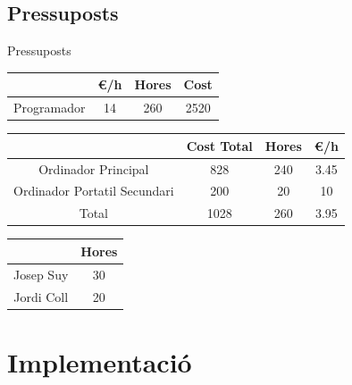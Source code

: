 \documentclass[11pt]{beamer}
\begin{document}
  \subsection{Pressuposts}
  \begin{frame}{Pressuposts}
    \begin{center}
      \begin{tabular}{|| c | c | c | c||} 
      \hline
       & \euro/h & Hores & Cost \\ [0.5ex] 
      \hline\hline
      Programador & 14 & 260 & 2520 \\ [1ex] 
      \hline
     \end{tabular}
     \end{center}
  
     \begin{center}
      \begin{tabular}{|| c | c | c | c||} 
      \hline
       & Cost Total & Hores & \euro/h \\ [0.5ex] 
      \hline\hline
      Ordinador Principal & 828 & 240 & 3.45 \\ [1ex] 
      Ordinador Portatil Secundari & 200 & 20 & 10 \\ [1ex] 
      \hline\hline
      Total & 1028 & 260 & 3.95 \\
      \hline
     \end{tabular}
     \end{center}
  
     \begin{center}
      \begin{tabular}{|| c | c ||} 
      \hline
       & Hores \\ [0.5ex] 
      \hline\hline
      Josep Suy & 30 \\ [1ex] 
      Jordi Coll & 20 \\ [1ex] 
      \hline
     \end{tabular}
     \end{center}
  \end{frame}

  \section{Implementació}
  
\end{document}
